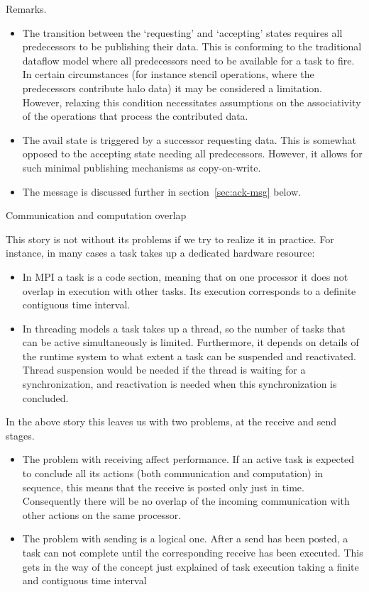 Remarks.
\begin{itemize}
\item The transition between the `requesting' and `accepting' states
  requires all predecessors to be publishing their data.  This is
  conforming to the traditional dataflow model where all predecessors
  need to be available for a task to fire.  In certain circumstances
  (for instance stencil operations, where the predecessors contribute
  halo data) it may be considered a limitation. However, relaxing this
  condition necessitates assumptions on the associativity of the
  operations that process the contributed data.
\item The avail state is triggered by a successor requesting
  data. This is somewhat opposed to the accepting state needing all
  predecessors. However, it allows for such minimal publishing
  mechanisms as copy-on-write.
\item The  message is discussed further
  in section~\ref{sec:ack-msg} below.
\end{itemize}

 {Communication and computation overlap}
\label{sec:post-xpct}

This story is not without its problems if we try to realize it in practice.
For instance, in many cases a task takes up a dedicated hardware resource:
\begin{itemize}
\item In MPI a task is a code section, meaning that on one processor it does
  not overlap in execution with other tasks. Its execution corresponds to
  a definite contiguous time interval.
\item In threading models a task takes up a thread, so the number of tasks
  that can be active simultaneously is limited. Furthermore, it depends on
  details of the runtime system to what extent a task can be suspended and reactivated.
  Thread suspension would be needed if the thread is waiting for a synchronization,
  and reactivation is needed when this synchronization is concluded.
\end{itemize}
In the above story this leaves us with two problems, at the receive and send stages.
\begin{itemize}
\item The problem with receiving affect performance. If an active task is
  expected to conclude all its actions (both communication and computation)
  in sequence, this means that the receive is posted only just in time.
  Consequently there will be no overlap of the incoming communication
  with other actions on the same processor.
\item The problem with sending is a logical one. After a send has been posted,
  a task can not complete until the corresponding receive has been executed.
  This gets in the way of the concept just explained of task execution taking
  a finite and contiguous time interval
\end{itemize}

